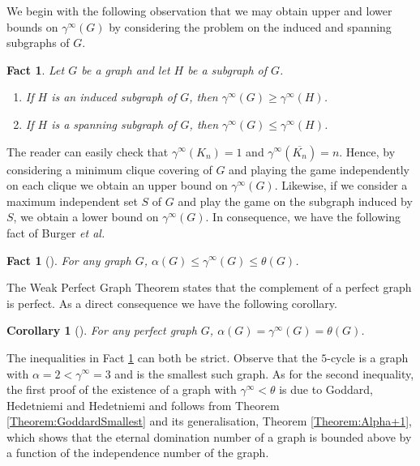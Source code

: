 \documentclass[11pt]{article}
\newtheorem{fact}[thm]{Fact}
\newtheorem{cor}[thm]{Corollary}
\begin{document}
We begin with the following observation that we may obtain upper and lower bounds on $\gamma^\infty(G)$ by considering the problem on the induced and spanning subgraphs of $G$.
	
	\begin{fact} \label{Fact:Spanning}
		Let $G$ be a graph and let $H$ be a subgraph of $G$.
		\begin{enumerate}[label=(\alph*)]
			\item \rm{\cite{klostermeyer2009eternal}} \textit{If $H$ is an induced subgraph of $G$, then $\gamma^\infty(G) \geq \gamma^\infty(H)$.}
			\item \rm{\cite{anderson2007maximum}} \textit{If $H$ is a spanning subgraph of $G$, then $\gamma^\infty(G) \leq \gamma^\infty(H)$.}
		\end{enumerate}
	\end{fact}
	
	
	 The reader can easily check that $\gamma^\infty(K_n)=1$ and $\gamma^\infty(\overline{K_n})=n$. Hence, by considering a minimum clique covering of $G$ and playing the game independently on each clique we obtain an upper bound on $\gamma^\infty(G)$. Likewise, if we consider a maximum independent set $S$ of $G$ and play the game on the subgraph induced by $S$, we obtain a lower bound on $\gamma^\infty(G)$. In consequence, we have the following fact of Burger \textit{et al.}
	
	\begin{fact} [\cite{burger2004infinite}] \label{Fact:Bounds}
		For any graph $G$, $\alpha(G) \leq \gamma^\infty(G) \leq \theta(G)$.
	\end{fact}
	
	The Weak Perfect Graph Theorem \cite{lovasz1972characterization, lovasz1972normal} states that the complement of a perfect graph is perfect. As a direct consequence we have the following corollary.
	
	\begin{cor} [\cite{burger2004infinite}] \label{Corollary:Perfect}
		For any perfect graph $G$, $\alpha(G)=\gamma^\infty(G)=\theta(G)$.
	\end{cor}
	
	The inequalities in Fact \ref{Fact:Bounds} can both be strict. Observe that the $5$-cycle is a graph with $\alpha=2<\gamma^\infty=3$ and is the smallest such graph. As for the second inequality, the first proof of the existence of a graph with $\gamma^\infty<\theta$ is due to Goddard, Hedetniemi and Hedetniemi \cite{goddard2005eternal} and follows from Theorem \ref{Theorem:GoddardSmallest} and its generalisation, Theorem \ref{Theorem:Alpha+1}, which shows that the eternal domination number of a graph is bounded above by a function of the independence number of the graph.
\end{document}
